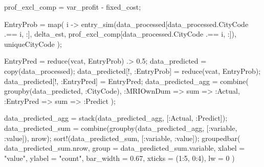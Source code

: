 \documentclass[
  letterpaper,
  DIV=11,
  numbers=noendperiod]{scrreprt}
\newenvironment{Shaded}{\begin{snugshade}}{\end{snugshade}}
\newcommand{\FloatTok}[1]{\textcolor[rgb]{0.68,0.00,0.00}{#1}}
\newcommand{\FunctionTok}[1]{\textcolor[rgb]{0.28,0.35,0.67}{#1}}
\newcommand{\NormalTok}[1]{\textcolor[rgb]{0.00,0.23,0.31}{#1}}
\newcommand{\OperatorTok}[1]{\textcolor[rgb]{0.37,0.37,0.37}{#1}}
\newcommand{\StringTok}[1]{\textcolor[rgb]{0.13,0.47,0.30}{#1}}
\begin{document}
\begin{Shaded}
\begin{Highlighting}[]
\NormalTok{prof\_excl\_comp }\OperatorTok{=}\NormalTok{ var\_profit }\OperatorTok{{-}}\NormalTok{ fixed\_cost;}

\NormalTok{EntryProb }\OperatorTok{=} \FunctionTok{map}\NormalTok{(}
\NormalTok{    i }\OperatorTok{{-}\textgreater{}} \FunctionTok{entry\_sim}\NormalTok{(data\_processed[data\_processed.CityCode }\OperatorTok{.==}\NormalTok{ i, }\OperatorTok{:}\NormalTok{], delta\_est, prof\_excl\_comp[data\_processed.CityCode }\OperatorTok{.==}\NormalTok{ i, }\OperatorTok{:}\NormalTok{]), }
\NormalTok{    uniqueCityCode}
\NormalTok{);}
\end{Highlighting}
\end{Shaded}

\begin{Shaded}
\begin{Highlighting}[]
\NormalTok{EntryPred }\OperatorTok{=} \FunctionTok{reduce}\NormalTok{(vcat, EntryProb) }\OperatorTok{.\textgreater{}} \FloatTok{0.5}\NormalTok{;}
\NormalTok{data\_predicted }\OperatorTok{=} \FunctionTok{copy}\NormalTok{(data\_processed);}
\NormalTok{data\_predicted[!, }\OperatorTok{:}\NormalTok{EntryProb] }\OperatorTok{=} \FunctionTok{reduce}\NormalTok{(vcat, EntryProb);}
\NormalTok{data\_predicted[!, }\OperatorTok{:}\NormalTok{EntryPred] }\OperatorTok{=}\NormalTok{ EntryPred;}
\NormalTok{data\_predicted\_agg }\OperatorTok{=} \FunctionTok{combine}\NormalTok{(}
    \FunctionTok{groupby}\NormalTok{(data\_predicted, }\OperatorTok{:}\NormalTok{CityCode),}
    \OperatorTok{:}\NormalTok{MRIOwnDum }\OperatorTok{=\textgreater{}}\NormalTok{ sum }\OperatorTok{=\textgreater{}} \OperatorTok{:}\NormalTok{Actual,}
    \OperatorTok{:}\NormalTok{EntryPred }\OperatorTok{=\textgreater{}}\NormalTok{ sum }\OperatorTok{=\textgreater{}} \OperatorTok{:}\NormalTok{Predict}
\NormalTok{);}

\NormalTok{data\_predicted\_agg }\OperatorTok{=} \FunctionTok{stack}\NormalTok{(data\_predicted\_agg, [}\OperatorTok{:}\NormalTok{Actual, }\OperatorTok{:}\NormalTok{Predict]);}
\NormalTok{data\_predicted\_sum }\OperatorTok{=} \FunctionTok{combine}\NormalTok{(}\FunctionTok{groupby}\NormalTok{(data\_predicted\_agg, [}\OperatorTok{:}\NormalTok{variable, }\OperatorTok{:}\NormalTok{value]), nrow);}
\FunctionTok{sort!}\NormalTok{(data\_predicted\_sum, [}\OperatorTok{:}\NormalTok{variable, }\OperatorTok{:}\NormalTok{value]);}
\FunctionTok{groupedbar}\NormalTok{(}
\NormalTok{    data\_predicted\_sum.nrow, }
\NormalTok{    group }\OperatorTok{=}\NormalTok{ data\_predicted\_sum.variable,}
\NormalTok{    xlabel }\OperatorTok{=} \StringTok{"value"}\NormalTok{, }
\NormalTok{    ylabel }\OperatorTok{=} \StringTok{"count"}\NormalTok{,}
\NormalTok{    bar\_width }\OperatorTok{=} \FloatTok{0.67}\NormalTok{,}
\NormalTok{    xticks }\OperatorTok{=}\NormalTok{ (}\FloatTok{1}\OperatorTok{:}\FloatTok{5}\NormalTok{, }\FloatTok{0}\OperatorTok{:}\FloatTok{4}\NormalTok{),}
\NormalTok{    lw }\OperatorTok{=} \FloatTok{0}
\NormalTok{)}
\end{Highlighting}
\end{Shaded}
\end{document}
